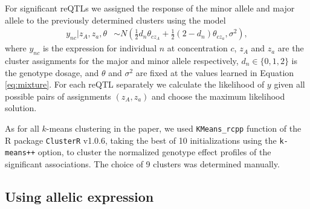 \documentclass[9pt,lineno]{elife}
\begin{document}
For significant reQTLs we assigned the response of the minor allele and major allele to the previously determined clusters using the model
\begin{align*}
y_{nc} | z_A,z_a, \theta &\sim N\left( \frac12 d_n \theta_{cz_A} + \frac12 (2 - d_n) \theta_{cz_a}, \sigma^2 \right),
\end{align*}
where $y_{nc}$ is the expression for individual $n$ at concentration $c$, $z_A$ and $z_a$ are the cluster assignments for the major and minor allele respectively, $d_n \in \{0,1,2\}$ is the genotype dosage, and $\theta$ and $\sigma^2$ are fixed at the values learned in Equation \ref{eq:mixture}. For each reQTL separately we calculate the likelihood of $y$ given all possible pairs of assignments $(z_A,z_a)$ and choose the maximum likelihood solution. 

As for all $k$-means clustering in the paper, we used \texttt{KMeans\_rcpp} function of the R package \texttt{ClusterR} v1.0.6, taking the best of 10 initializations using the \texttt{k-means++} option, to cluster the normalized genotype effect profiles of the significant associations. The choice of 9 clusters was determined manually. 

\subsection*{Using allelic expression} 
\end{document}
